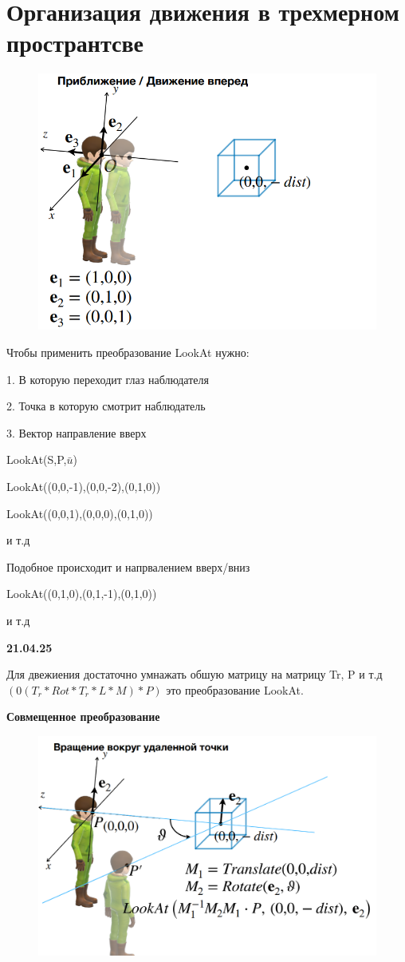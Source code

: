 \documentclass{article}
\begin{document}
\section{Организация движения в трехмерном пространтсве}

\begin{figure} [H]
    \includegraphics[width=0.70\linewidth]{Снимок экрана 2025-04-14 133843.png}
\end{figure}



Чтобы применить преобразование LookAt нужно:

1. В которую переходит глаз наблюдателя

2. Точка в которую смотрит наблюдатель

3. Вектор направление вверх

LookAt(S,P,$\bar{u}$)


LookAt((0,0,-1),(0,0,-2),(0,1,0))

LookAt((0,0,1),(0,0,0),(0,1,0))

и т.д 

Подобное происходит и напрвалением вверх/вниз

LookAt((0,1,0),(0,1,-1),(0,1,0))

и т.д


\vspace{1cm}

\textbf{21.04.25}


Для двежиения достаточно умнажать обшую матрицу на матрицу Tr, P и т.д
$(0(T_r*Rot*T_r*L*M)*P)$ это преобразование LookAt.



\textbf{Совмещенное преобразование}


\begin{figure} [H]
    \includegraphics[width=0.70\linewidth]{Снимок экрана 2025-04-21 122739.png}
\end{figure}
\end{document}

